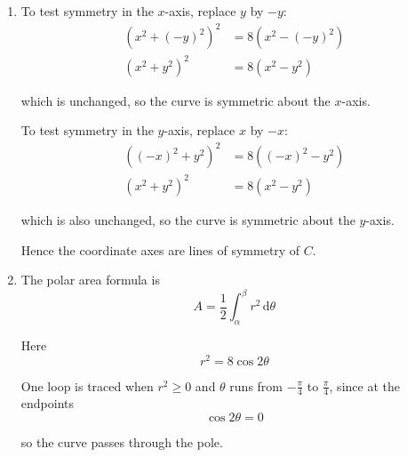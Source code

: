 \documentclass[leqno]{article}
\begin{document}
\begin{enumerate}[
	  label=\textbf{\arabic*.},
	  leftmargin=*,
	  topsep=0pt,
	  partopsep=0pt,
	  parsep=0pt
	]
\begin{djsSolution}
\begin{enumerate}[label=\textbf{(\alph*)}]
	and the identity
	\[
	\cos 2\theta=\cos^2\theta-\sin^2\theta
	\]

	with
	\[
	\cos\theta=\frac{x}{r},\qquad \sin\theta=\frac{y}{r}
	\]

	gives
	\begin{align*}
	\cos 2\theta
	&=\left(\frac{x}{r}\right)^2-\left(\frac{y}{r}\right)^2 \\
	&=\frac{x^2-y^2}{r^2}
	\end{align*}
	
	Now substitute into the polar equation \(r^2=8\cos 2\theta\):
	\[
	r^2=\frac{8(x^2-y^2)}{r^2}
	\]

	and since \(r^2=x^2+y^2\), this becomes
	\[
	x^2+y^2=\frac{8(x^2-y^2)}{x^2+y^2}
	\]

	Multiplying both sides by \(x^2+y^2\) gives
	\[
	(x^2+y^2)^2=8(x^2-y^2)
	\]

	\item To test symmetry in the \(x\)-axis, replace \(y\) by \(-y\):
	\begin{align*}
	(x^2+(-y)^2)^2&=8(x^2-(-y)^2) \\
	(x^2+y^2)^2&=8(x^2-y^2)
	\end{align*}

	which is unchanged, so the curve is symmetric about the \(x\)-axis.
	
	To test symmetry in the \(y\)-axis, replace \(x\) by \(-x\):
	\begin{align*}
	(( -x)^2+y^2)^2&=8(( -x)^2-y^2) \\
	(x^2+y^2)^2&=8(x^2-y^2)
	\end{align*}

	which is also unchanged, so the curve is symmetric about the \(y\)-axis.
	
	Hence the coordinate axes are lines of symmetry of \(C\).
	
	\item The polar area formula is
	\[
	A=\frac12\int_{\alpha}^{\beta} r^2\,\mathrm{d}\theta
	\]
	
	Here
	\[
	r^2=8\cos 2\theta
	\]

	One loop is traced when \(r^2\ge 0\) and \(\theta\) runs from \(-\frac{\pi}{4}\) to \(\frac{\pi}{4}\), since at the endpoints
	\[
	\cos 2\theta=0
	\]

	so the curve passes through the pole.
	

\end{enumerate}
\end{djsSolution}
\end{enumerate}
\end{document}
